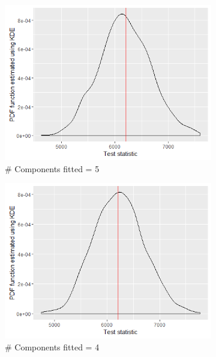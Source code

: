 \begin{figure}[!htb]
\centering
\captionsetup{justification=centering}
	\begin{subfigure}[b]{0.4\textwidth}
		\includegraphics[width=\textwidth]{mainmatter/chapter_5_simulation_study/ppc_5wellsep5comp.png}
          \caption{\label{fig : ppc_5wellsep5comp}\# Components fitted = 5}
	\end{subfigure}
	\begin{subfigure}[b]{0.4\textwidth}
		\includegraphics[width=\textwidth]{mainmatter/chapter_5_simulation_study/ppc_5wellsep4comp.png}
          \caption{\label{fig : ppc_5wellsep4comp}\# Components fitted = 4}
	\end{subfigure}
	\begin{subfigure}[b]{0.4\textwidth}

\end{subfigure}
\end{figure}
